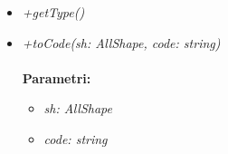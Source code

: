 \begin{itemize}
\begin{itemize}
    		\item \emph{+getType()}\\
    		
    		\item \emph{+toCode(sh: AllShape, code: string)}\\
    		\\
    		\textbf{Parametri:}
    		\begin{itemize}
    			\item \emph{sh: AllShape}\\
    			
    			\item \emph{code: string}\\
    			
    		\end{itemize}
    	\end{itemize}
\end{itemize}